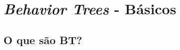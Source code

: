 
\chapter{\textit{Behavior Trees} - Básicos} %

\label{Chapter2} %



\section{O que são BT?}

\begin{tikzpicture}
    
\end{tikzpicture}